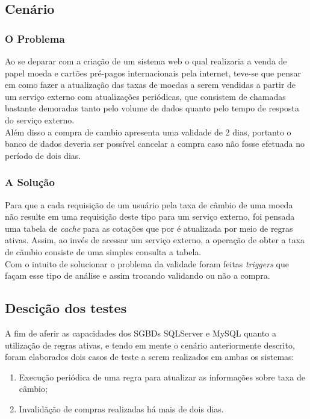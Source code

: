 \documentclass[conference]{IEEEtran}
\begin{document}
  \subsection{Cenário}
    \subsubsection{O Problema}
    Ao se deparar com a criação de um sistema web o qual realizaria a venda de papel moeda e cartões pré-pagos internacionais pela internet, teve-se que pensar em como fazer a atualização das taxas de moedas a serem vendidas a partir de um serviço externo com atualizações periódicas, que consistem de chamadas bastante demoradas tanto pelo volume de dados quanto pelo tempo de resposta do serviço externo.\\
    Além disso a compra de cambio apresenta uma validade de 2 dias, portanto o banco de dados deveria ser possível cancelar a compra caso não fosse efetuada no período de dois dias.

    \subsubsection{A Solução}
    Para que a cada requisição de um usuário pela taxa de câmbio de uma moeda não resulte em uma requisição deste tipo para um serviço externo, foi pensada uma tabela de \textit{cache} para as cotações que por é atualizada por meio de regras ativas. Assim, ao invés de acessar um serviço externo, a operação de obter a taxa de câmbio consiste de uma simples consulta a tabela.\\
    Com o intuito de solucionar o problema da validade foram feitas \textit{triggers} que façam esse tipo de análise e assim trocando validando ou não a compra.

  \subsection{Descição dos testes}
  A fim de aferir as capacidades dos SGBDs SQLServer e MySQL quanto a utilização de regras ativas, e tendo em mente o cenário anteriormente descrito, foram elaborados dois casos de teste a serem realizados em ambas os sistemas:

  \begin{enumerate}
    \item Execução periódica de uma regra para atualizar as informações sobre taxa de câmbio;
    \item Invalidãção de compras realizadas há mais de dois dias.
  \end{enumerate}
\end{document}
